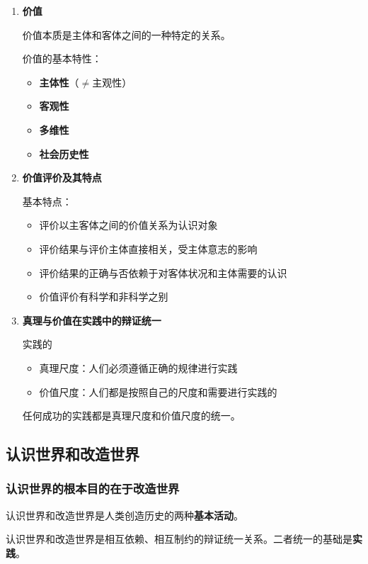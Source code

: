 \documentclass[12pt, a4paper, oneside]{ctexart}
\begin{document}
\begin{enumerate}
  \item {\bf 价值}
  
  价值本质是主体和客体之间的一种特定的关系。
  
  价值的基本特性：
  \begin{itemize}
    \item {\bf 主体性}（$\neq$主观性）
    \item {\bf 客观性}
    \item {\bf 多维性}
    \item {\bf 社会历史性}
  \end{itemize}

  \item {\bf 价值评价及其特点}
  
  基本特点：
  \begin{itemize}
    \item 评价以主客体之间的价值关系为认识对象
    \item 评价结果与评价主体直接相关，受主体意志的影响
    \item 评价结果的正确与否依赖于对客体状况和主体需要的认识
    \item 价值评价有科学和非科学之别
  \end{itemize}

  \item {\bf 真理与价值在实践中的辩证统一}
  
  实践的
  \begin{itemize}
    \item 真理尺度：人们必须遵循正确的规律进行实践
    \item 价值尺度：人们都是按照自己的尺度和需要进行实践的
  \end{itemize}

  任何成功的实践都是真理尺度和价值尺度的统一。

\end{enumerate}

\subsection{认识世界和改造世界}

\subsubsection{认识世界的根本目的在于改造世界}

认识世界和改造世界是人类创造历史的两种\textbf{基本活动}。

认识世界和改造世界是相互依赖、相互制约的辩证统一关系。二者统一的基础是\textbf{实践}。
\end{document}
